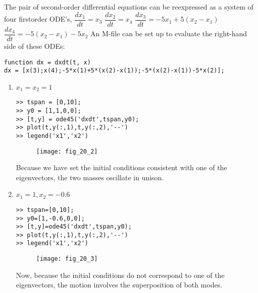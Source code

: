 \documentclass[../main.tex]{subfiles}
\begin{document}
\section{}
The pair of second-order differential equations can be reexpressed as a system of four firstorder ODE's,
	\bigbreak
$\dfrac{d x_{1}}{d t}=x_{3}$
	\bigbreak
$\dfrac{d x_{2}}{d t}=x_{4} $
	\bigbreak
$\dfrac{d x_{3}}{d t}=-5 x_{1}+5\left(x_{2}-x_{1}\right) $
	\bigbreak
$\dfrac{d x_{4}}{d t}=-5\left(x_{2}-x_{1}\right)-5 x_{2} $
	\bigbreak
An M-file can be set up to evaluate the right-hand side of these ODEs:
	\bigbreak
\begin{lstlisting}[numbers=none]
function dx = dxdt(t, x)
dx = [x(3);x(4);-5*x(1)+5*(x(2)-x(1));-5*(x(2)-x(1))-5*x(2)]; 
\end{lstlisting}
	\bigbreak
\begin{enumerate}[label=\bfseries(\alph*)]
\item $x_{1}=x_{2}=1$
	\bigbreak
\begin{lstlisting}[numbers=none]
>> tspan = [0,10];
>> y0 = [1,1,0,0];
>> [t,y] = ode45('dxdt',tspan,y0);
>> plot(t,y(:,1),t,y(:,2),'--')
>> legend('x1','x2')
\end{lstlisting}
	\bigbreak
	\begin{figure}[H]
		\texttt{[image: fig\_20\_2]}
		\label{fig:fig_20_2}
	\end{figure}
	\bigbreak
Because we have set the initial conditions consistent with one of the eigenvectors, the two masses oscillate in unison.
	\bigbreak
\item $x_{1}=1, x_{2}=-0.6$
	\bigbreak
\begin{lstlisting}[numbers=none]
>> tspan=[0,10];
>> y0=[1,-0.6,0,0];
>> [t,y]=ode45('dxdt',tspan,y0);
>> plot(t,y(:,1),t,y(:,2),'--')
>> legend('x1','x2')
\end{lstlisting}
	\bigbreak
	\begin{figure}[H]
		\texttt{[image: fig\_20\_3]}
		\label{fig:fig_20_3}
	\end{figure}
	\bigbreak
Now, because the initial conditions do not correspond to one of the eigenvectors, the motion involves the superposition of both modes.
	\bigbreak
\end{enumerate}
\end{document}
